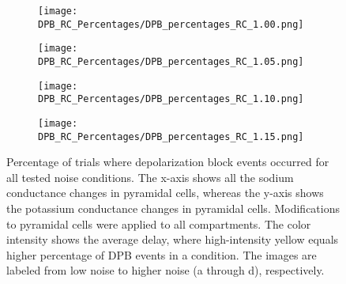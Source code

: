 \begin{figure}[htbp]
    \centering
    \begin{subfigure}{0.48\textwidth}
        \texttt{[image: DPB\_RC\_Percentages/DPB\_percentages\_RC\_1.00.png]}
        \caption{} %
    \end{subfigure}\hfill
    \begin{subfigure}{0.48\textwidth}
        \texttt{[image: DPB\_RC\_Percentages/DPB\_percentages\_RC\_1.05.png]}
        \caption{} %
    \end{subfigure}

    \bigskip %

    \begin{subfigure}{0.48\textwidth}
        \texttt{[image: DPB\_RC\_Percentages/DPB\_percentages\_RC\_1.10.png]}
        \caption{} %
    \end{subfigure}\hfill
    \begin{subfigure}{0.48\textwidth}
        \texttt{[image: DPB\_RC\_Percentages/DPB\_percentages\_RC\_1.15.png]}
        \caption{} %
    \end{subfigure}

    \caption[RC DPB percentage matrices (all)]{Percentage of trials where depolarization block events occurred for all tested noise conditions.
        The x-axis shows all the sodium conductance changes in pyramidal cells, whereas the y-axis shows the potassium conductance changes in pyramidal cells.
        Modifications to pyramidal cells were applied to all compartments.
        The color intensity shows the average delay, where high-intensity yellow equals higher percentage of DPB events in a condition.
        The images are labeled from low noise to higher noise (a through d), respectively.}\label{fig:rc_dpb_percentage_matrices}
\end{figure}